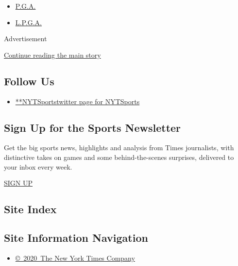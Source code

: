 \begin{itemize}
\tightlist
\item
  \protect\hyperlink{}{P.G.A.}
\item
  \protect\hyperlink{}{L.P.G.A.}
\end{itemize}

Advertisement

\protect\hyperlink{after-mktg}{Continue reading the main story}

\hypertarget{follow-us}{%
\subsection{Follow Us}\label{follow-us}}

\begin{itemize}
\tightlist
\item
  \href{https://twitter.com/NYTSports}{**NYTSportstwitter page for
  NYTSports}
\end{itemize}

\hypertarget{sign-up-for-the-sports-newsletter}{%
\subsection{Sign Up for the Sports
Newsletter}\label{sign-up-for-the-sports-newsletter}}

Get the big sports news, highlights and analysis from Times journalists,
with distinctive takes on games and some behind-the-scenes surprises,
delivered to your inbox every week.

\href{/newsletters/signup/SP}{SIGN UP}

\hypertarget{site-index}{%
\subsection{Site Index}\label{site-index}}

\hypertarget{site-information-navigation}{%
\subsection{Site Information
Navigation}\label{site-information-navigation}}

\begin{itemize}
\tightlist
\item
  \href{https://help.nytimes3xbfgragh.onion/hc/en-us/articles/115014792127-Copyright-notice}{©~2020~The
  New York Times Company}
\end{itemize}

